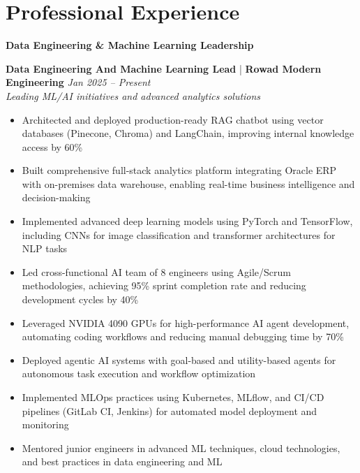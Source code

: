 \documentclass[10pt, letterpaper]{article}
\newcommand{\jobtitle}[4]{
    \textbf{\textcolor{primaryColor}{#1}} | \textbf{#2} \hfill \textit{#3} \\
    \textit{#4}
}
\begin{document}
\section{Professional Experience}

\textbf{\textcolor{primaryColor}{Data Engineering \& Machine Learning Leadership}}

\jobtitle{Data Engineering And Machine Learning Lead}{Rowad Modern Engineering}{Jan 2025 – Present}{Leading ML/AI initiatives and advanced analytics solutions}
\begin{itemize}[leftmargin=1cm, itemsep=0.3ex]
    \item Architected and deployed production-ready RAG chatbot using vector databases (Pinecone, Chroma) and LangChain, improving internal knowledge access by 60\%
    \item Built comprehensive full-stack analytics platform integrating Oracle ERP with on-premises data warehouse, enabling real-time business intelligence and decision-making
    \item Implemented advanced deep learning models using PyTorch and TensorFlow, including CNNs for image classification and transformer architectures for NLP tasks
    \item Led cross-functional AI team of 8 engineers using Agile/Scrum methodologies, achieving 95\% sprint completion rate and reducing development cycles by 40\%
    \item Leveraged NVIDIA 4090 GPUs for high-performance AI agent development, automating coding workflows and reducing manual debugging time by 70\%
    \item Deployed agentic AI systems with goal-based and utility-based agents for autonomous task execution and workflow optimization
    \item Implemented MLOps practices using Kubernetes, MLflow, and CI/CD pipelines (GitLab CI, Jenkins) for automated model deployment and monitoring
    \item Mentored junior engineers in advanced ML techniques, cloud technologies, and best practices in data engineering and ML
\end{itemize}
\end{document}
